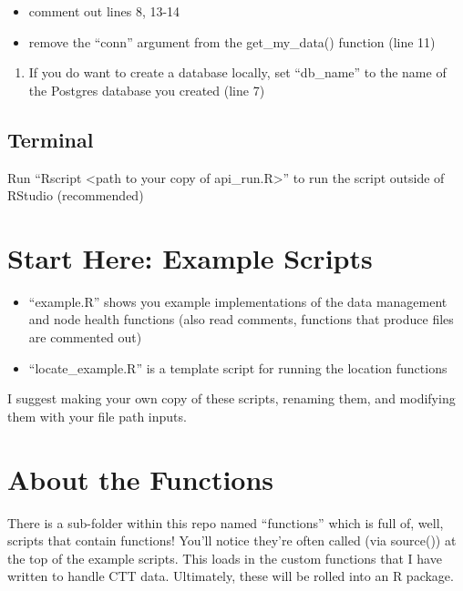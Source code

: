 \documentclass[
]{book}
\providecommand{\tightlist}{%
  \setlength{\itemsep}{0pt}\setlength{\parskip}{0pt}}
\begin{document}
\begin{itemize}
\tightlist
\item
  comment out lines 8, 13-14
\item
  remove the ``conn'' argument from the get\_my\_data() function (line 11)
\end{itemize}

\begin{enumerate}
\def\labelenumi{\arabic{enumi}.}
\setcounter{enumi}{3}
\tightlist
\item
  If you do want to create a database locally, set ``db\_name'' to the name of the Postgres database you created (line 7)
\end{enumerate}

\hypertarget{terminal}{%
\section{Terminal}\label{terminal}}

Run ``Rscript \textless path to your copy of api\_run.R\textgreater{}'' to run the script outside of RStudio (recommended)

\hypertarget{start-here-example-scripts}{%
\chapter{Start Here: Example Scripts}\label{start-here-example-scripts}}

\begin{itemize}
\tightlist
\item
  ``example.R'' shows you example implementations of the data management and node health functions (also read comments, functions that produce files are commented out)
\item
  ``locate\_example.R'' is a template script for running the location functions
\end{itemize}

I suggest making your own copy of these scripts, renaming them, and modifying them with your file path inputs.

\hypertarget{about-the-functions}{%
\chapter{About the Functions}\label{about-the-functions}}

There is a sub-folder within this repo named ``functions'' which is full of, well, scripts that contain functions! You'll notice they're often called (via source()) at the top of the example scripts. This loads in the custom functions that I have written to handle CTT data. Ultimately, these will be rolled into an R package.
\end{document}
